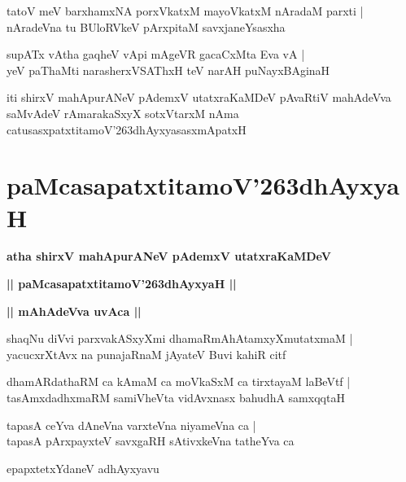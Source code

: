 \documentclass[twoside,12pt,openright]{book}
\def\S{\char'263}
\newcounter{shloka}[chapter]
\def\uvaca#1{\centerline{{\large\textbf{#1}}}}
\begin{document}
\begin{shloka}%
tatoV meV barxhamxNA porxVkatxM mayoVkatxM nAradaM parxti |\\
nAradeVna tu BUloRVkeV pArxpitaM savxjaneYsasxha
\end{shloka}

\begin{shloka}%
supATx vAtha gaqheV vApi mAgeVR gacaCxMta Eva vA |\\
yeV paThaMti narasherxVSAThxH teV narAH puNayxBAginaH
\end{shloka}

\begin{center}
iti shirxV mahApurANeV pAdemxV utatxraKaMDeV pAvaRtiV mahAdeVva saMvAdeV rAmarakaSxyX sotxVtarxM 
nAma catusasxpatxtitamoV\S dhAyxyasasxmApatxH 
\end{center}

\chapter{paMcasapatxtitamoV\S dhAyxyaH}

\begin{center}
{\LARGE\bfseries atha shirxV mahApurANeV pAdemxV utatxraKaMDeV}
\end{center}

\begin{center}
{\LARGE\bfseries || paMcasapatxtitamoV\S dhAyxyaH || }
\end{center}

\uvaca{|| mAhAdeVva uvAca ||}

\begin{shloka}%
shaqNu diVvi parxvakASxyXmi dhamaRmAhAtamxyXmutatxmaM |\\
yacucxrXtAvx na punajaRnaM jAyateV Buvi kahiR citf 
\end{shloka}

\begin{shloka}%
dhamARdathaRM ca kAmaM ca moVkaSxM ca tirxtayaM laBeVtf |\\
tasAmxdadhxmaRM samiVheVta vidAvxnasx bahudhA samxqqtaH 
\end{shloka}

\begin{shloka}%
tapasA ceYva dAneVna varxteVna niyameVna ca |\\
tapasA pArxpayxteV savxgaRH sAtivxkeVna tatheYva ca 
\end{shloka}

\begin{center}
epapxtetxYdaneV adhAyxyavu
\end{center}
\end{document}
